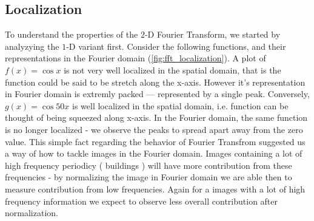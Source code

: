 \documentclass{report}
\begin{document}
\subsection{Localization}
To understand the properties of the $2$-D Fourier Transform, we started by analyzying the $1$-D variant first. Consider the following functions, and their representations in the Fourier domain (\ref{fig:fft_localization}). A plot of $f(x)=\cos {x}$ is not very well localized in the spatial domain, that is the function could be said to be stretch along the x-axis. However it's representation in Fourier domain is extremly packed --- represented by a single peak. Conversely, $g(x)=\cos {50x}$ is well localized in the spatial domain, i.e. function can be thought of being squeezed along x-axis. In the Fourier domain, the same function is no longer localized - we observe the peaks to spread apart away from the zero value. This simple fact regarding the behavior of Fourier Transfrom suggested us a way of how to tackle images in the Fourier domain. Images containing a lot of high frequency periodicy ( buildings ) will have more contribution from these frequencies - by normalizing the image in Fourier domain we are able then to measure contribution from low frequencies. Again for a images with a lot of high frequency information we expect to observe less overall contribution after normalization.
\end{document}
